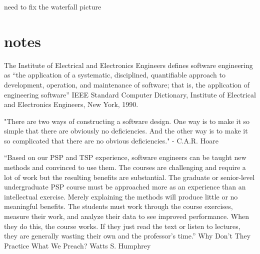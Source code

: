 need to fix the waterfall picture

\chapter{notes}

The Institute of Electrical and Electronics Engineers defines software engineering as 
“the application of a systematic, disciplined, quantifiable approach to development, 
operation, and maintenance of software; that is, the application of engineering software”
IEEE Standard Computer Dictionary, Institute
of Electrical and Electronics Engineers, New
York, 1990.

"There are two ways of constructing a software design. One way is to make it so simple 
that there are obviously no deficiencies. And the other way is to make it so complicated that
there are no obvious deficiencies."
- C.A.R. Hoare

``Based on our PSP and TSP experience, software engineers can be taught new methods and
convinced to use them. The courses are challenging and require a lot of work but the 
resulting benefits are substantial. The graduate or senior-level undergraduate PSP 
course must be approached more as an experience than an intellectual exercise. 
Merely explaining the methods will produce little or no meaningful benefits. 
The students must work through the course exercises, measure their work, and 
analyze their data to see improved performance. When they do this, the course works. 
If they just read the text or listen to lectures, they are generally wasting their 
own and the professor's time.''
Why Don't They Practice What We Preach?
Watts S. Humphrey

